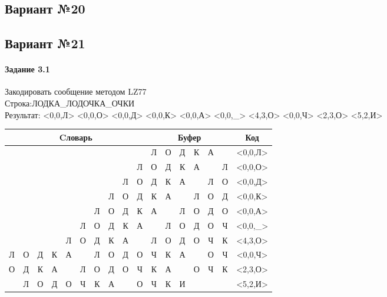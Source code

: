\documentclass[a4paper, 12pt]{article}
\begin{document}
\pagebreak
\subsection{Вариант №20}

\pagebreak
\subsection{Вариант №21}
\paragraph{Задание 3.1}

Закодировать сообщение методом LZ77\\
Строка:ЛОДКА\_ЛОДОЧКА\_ОЧКИ\\
Результат: <0,0,Л> <0,0,О> <0,0,Д> <0,0,К> <0,0,А> <0,0,\_> <4,3,О> <0,0,Ч> <2,3,О> <5,2,И>\\
\begin{table}[h!]
\centering
\begin{tabular}{|c|c|c|c|c|c|c|c|c|c|c|c|c|c|c|c|c|} 
\hline
\multicolumn{10}{|c|}{Cловарь} & \multicolumn{6}{c|}{Буфер} & Код  \\ \hline
  &   &   &   &   &   &   &   &   &   & \cellcolor[HTML]{8CE4F6} Л & О & Д & К & А &   & <0,0,Л>
\\ \hline
  &   &   &   &   &   &   &   &   & Л & \cellcolor[HTML]{8CE4F6} О & Д & К & А &   & Л & <0,0,О>
\\ \hline
  &   &   &   &   &   &   &   & Л & О & \cellcolor[HTML]{8CE4F6} Д & К & А &   & Л & О & <0,0,Д>
\\ \hline
  &   &   &   &   &   &   & Л & О & Д & \cellcolor[HTML]{8CE4F6} К & А &   & Л & О & Д & <0,0,К>
\\ \hline
  &   &   &   &   &   & Л & О & Д & К & \cellcolor[HTML]{8CE4F6} А &   & Л & О & Д & О & <0,0,А>
\\ \hline
  &   &   &   &   & Л & О & Д & К & А & \cellcolor[HTML]{8CE4F6}   & Л & О & Д & О & Ч & <0,0,\_>
\\ \hline
  &   &   &   & \cellcolor[HTML]{FFFF00} Л & \cellcolor[HTML]{FFFF00} О & \cellcolor[HTML]{FFFF00} Д & К & А &   & \cellcolor[HTML]{FFFF00} Л & \cellcolor[HTML]{FFFF00} О & \cellcolor[HTML]{FFFF00} Д & \cellcolor[HTML]{8CE4F6} О & Ч & К & <4,3,О>
\\ \hline
Л & О & Д & К & А &   & Л & О & Д & О & \cellcolor[HTML]{8CE4F6} Ч & К & А &   & О & Ч & <0,0,Ч>
\\ \hline
О & Д & \cellcolor[HTML]{FFFF00} К & \cellcolor[HTML]{FFFF00} А & \cellcolor[HTML]{FFFF00}   & Л & О & Д & О & Ч & \cellcolor[HTML]{FFFF00} К & \cellcolor[HTML]{FFFF00} А & \cellcolor[HTML]{FFFF00}   & \cellcolor[HTML]{8CE4F6} О & Ч & К & <2,3,О>
\\ \hline
  & Л & О & Д & О & \cellcolor[HTML]{FFFF00} Ч & \cellcolor[HTML]{FFFF00} К & А &   & О & \cellcolor[HTML]{FFFF00} Ч & \cellcolor[HTML]{FFFF00} К & \cellcolor[HTML]{8CE4F6} И &   &   &   & <5,2,И>
\\ \hline
\end{tabular}
\end{table}
\end{document}
